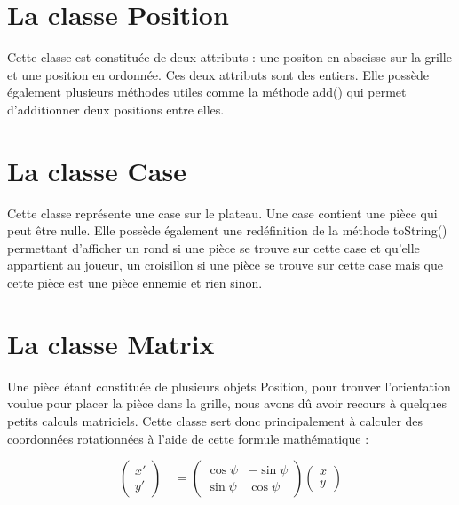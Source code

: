 \documentclass[a4paper, titlepage, french]{report}
\begin{document}
\bigskip

\section{La classe Position}

Cette classe est constituée de deux attributs : une positon en abscisse sur la grille et une position en 
ordonnée. Ces deux attributs sont des entiers. 
Elle possède également plusieurs méthodes utiles comme la méthode add() qui permet d'additionner deux 
positions entre elles.

\bigskip

\section{La classe Case}

Cette classe représente une case sur le plateau. Une case contient une pièce qui peut être nulle.
Elle possède également une redéfinition de la méthode toString() permettant d'afficher 
un rond si une pièce se trouve sur cette case et qu'elle appartient au joueur, un croisillon si une 
pièce se trouve sur cette case mais que cette pièce est une pièce ennemie et rien sinon.

\bigskip

\section{La classe Matrix}

Une pièce étant constituée de plusieurs objets Position, pour trouver l'orientation voulue pour placer
la pièce dans la grille, nous avons dû avoir recours à quelques petits calculs matriciels.
Cette classe sert donc principalement à calculer des coordonnées rotationnées à l'aide de cette
formule mathématique :

\[
    \begin{pmatrix}
        x' \\
        y'
    \end{pmatrix}
    \quad
    =
    \begin{pmatrix}
        \cos \psi & - \sin \psi \\
        \sin \psi & \cos \psi
    \end{pmatrix}
    \begin{pmatrix}
        x \\
        y
    \end{pmatrix}
\]


\bigskip
\end{document}
